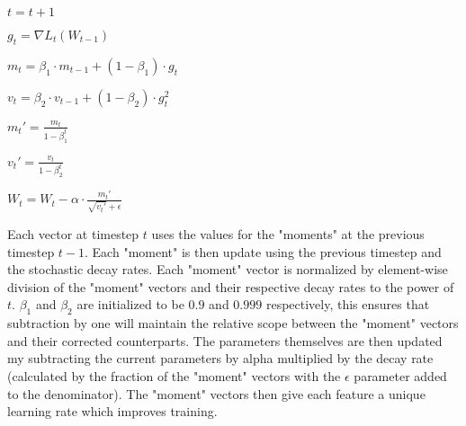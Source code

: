 \begin{center}


$t = t + 1$

$g_t = \nabla L_t(W_{t-1})$

$m_t = \beta_1 \cdot m_{t-1} + (1-\beta_1) \cdot g_t $

$v_t = \beta_2 \cdot v_{t-1} + (1-\beta_2) \cdot g_t^2 $

$m_t' = \frac{m_t}{1-\beta_1^t}$

$v_t' = \frac{v_t}{1-\beta_2^t}$

$W_t = W_t - \alpha \cdot \frac{m_t'}{\sqrt{v_t'} + \epsilon}$

\end{center}

Each vector at timestep $t$ uses the values for the "moments" at the previous timestep $t-1$. Each "moment" is then update using the previous timestep and the stochastic decay rates. Each "moment" vector is normalized by element-wise division of the "moment" vectors and their respective decay rates to the power of $t$. $\beta_1$ and $\beta_2$ are initialized to be $0.9$ and $0.999$ respectively, this ensures that subtraction by one will maintain the relative scope between the "moment" vectors and their corrected counterparts. The parameters themselves are then updated my subtracting the current parameters by alpha multiplied by the decay rate (calculated by the fraction of the "moment" vectors with the $\epsilon$ parameter added to the denominator). The "moment" vectors then give each feature a unique learning rate which improves training.